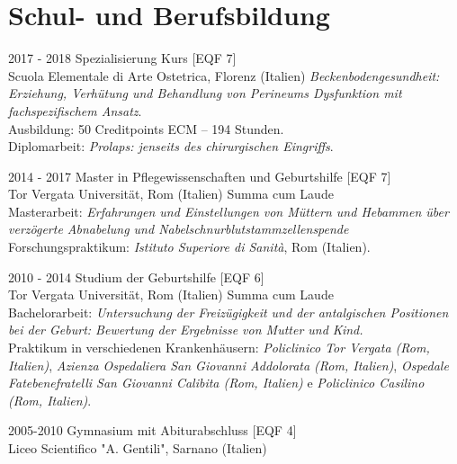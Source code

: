 \documentclass[11pt]{friggeri-cv}
\begin{document}
\vspace{-10pt}
\section{Schul- und Berufsbildung}
\begin{entrylist}
  \entry
  {2017 - 2018}
  {Spezialisierung Kurs [EQF 7]}
  {\\Scuola Elementale di Arte Ostetrica, Florenz (Italien)}
  {\emph{
      Beckenbodengesundheit: Erziehung, Verhütung und Behandlung
      von Perineums Dysfunktion mit fachspezifischem Ansatz}. \\
    Ausbildung: 50 Creditpoints ECM – 194 Stunden.\\ 
    Diplomarbeit: \emph{Prolaps: jenseits des chirurgischen Eingriffs}.\\
  }

  \entry
  {2014 - 2017}
  {Master in Pflegewissenschaften und Geburtshilfe [EQF 7]}
  {\\Tor Vergata Universit\"{a}t, Rom (Italien)}
  {
    Summa cum Laude\\
    Masterarbeit: \emph{
      Erfahrungen und Einstellungen von
      M\"{u}ttern und Hebammen \"{u}ber verz\"{o}gerte Abnabelung
      und Nabelschnurblutstammzellenspende}  
    \\Forschungspraktikum: \emph{Istituto Superiore di Sanit\`{a}}, Rom (Italien).\\
  }
  
  \entry
  {2010 - 2014}
  {Studium der Geburtshilfe [EQF 6]}
  {\\Tor Vergata Universit\"{a}t, Rom (Italien)}
  {
    Summa cum Laude\\
    Bachelorarbeit: \emph{
      Untersuchung der Freiz\"{u}gigkeit und der antalgischen
      Positionen bei der Geburt: Bewertung der Ergebnisse von Mutter und Kind.}\\
    Praktikum in verschiedenen Krankenhäusern:
    \emph{Policlinico Tor Vergata (Rom, Italien)},
    \emph{Azienza Ospedaliera San Giovanni Addolorata (Rom, Italien)}, 
    \emph{Ospedale Fatebenefratelli San Giovanni Calibita (Rom, Italien)} e 
    \emph{Policlinico Casilino (Rom, Italien)}.\\
  }
  
  \entry
  {2005-2010}
  {Gymnasium mit Abiturabschluss [EQF 4]}
  {\\Liceo Scientifico "A. Gentili", Sarnano (Italien)}
  {\\}
\end{entrylist}
\end{document}
